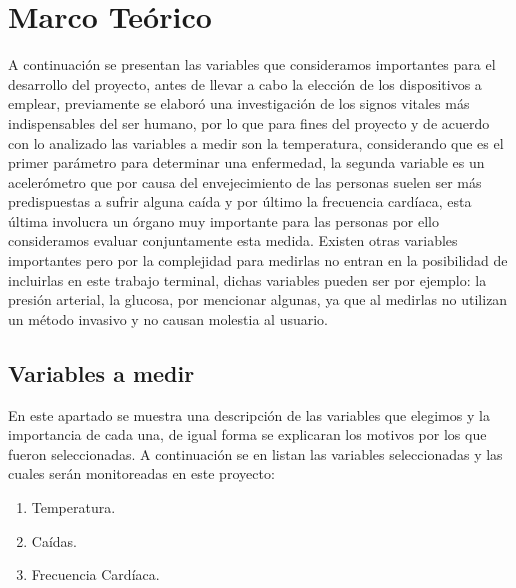 \section{Marco Teórico}

A continuación se presentan las variables que consideramos importantes para el desarrollo del proyecto, antes de llevar a cabo la elección de los dispositivos a emplear, previamente se elaboró una investigación de los signos vitales más indispensables del ser humano, por lo que para fines del proyecto y de acuerdo con lo analizado las variables a medir son la temperatura, considerando que es el primer parámetro para determinar una enfermedad, la segunda variable es un acelerómetro que por causa del envejecimiento de las personas suelen ser más predispuestas a sufrir alguna caída y por último la frecuencia cardíaca, esta última involucra un órgano muy importante para las personas por ello consideramos evaluar conjuntamente esta medida. Existen otras variables importantes pero por la complejidad para medirlas no entran en la posibilidad de incluirlas en este trabajo terminal, dichas variables pueden ser por ejemplo: la presión arterial, la glucosa, por mencionar algunas, ya que al medirlas no utilizan un método invasivo y no causan molestia al usuario. 

\subsection{Variables a medir}

En este apartado se muestra una descripción de las variables que elegimos y la importancia de cada una, de igual forma se explicaran los motivos por los que fueron seleccionadas. A continuación se en listan las variables seleccionadas y las cuales serán monitoreadas en este proyecto:

\begin{enumerate}
	\item Temperatura.
	\item Caídas.
	\item Frecuencia Cardíaca.
\end{enumerate}

